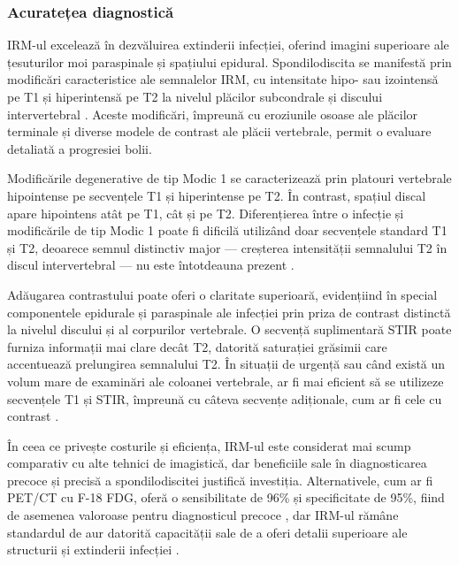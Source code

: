 \documentclass[romanian,12pt,a4paper]{article}
\begin{document}
\subsubsection{Acuratețea diagnostică}

IRM-ul excelează în dezvăluirea extinderii infecției, oferind imagini
superioare ale țesuturilor moi paraspinale și spațiului epidural.
Spondilodiscita se manifestă prin modificări caracteristice ale
semnalelor IRM, cu intensitate hipo- sau izointensă pe T1 și
hiperintensă pe T2 la nivelul plăcilor subcondrale și discului
intervertebral \cite{DiagnosticPerformanceMultiDetector2022}. Aceste
modificări, împreună cu eroziunile osoase ale plăcilor terminale și
diverse modele de contrast ale plăcii vertebrale, permit o evaluare
detaliată a progresiei bolii.

Modificările degenerative de tip Modic 1 se caracterizează prin platouri
vertebrale hipointense pe secvențele T1 și hiperintense pe T2. În
contrast, spațiul discal apare hipointens atât pe T1, cât și pe T2.
Diferențierea între o infecție și modificările de tip Modic 1 poate fi
dificilă utilizând doar secvențele standard T1 și T2, deoarece semnul
distinctiv major --- creșterea intensității semnalului T2 în discul
intervertebral --- nu este întotdeauna prezent
\cite{DegenerativeDiskDisease1988}.

Adăugarea contrastului poate oferi o claritate superioară, evidențiind
în special componentele epidurale și paraspinale ale infecției prin
priza de contrast distinctă la nivelul discului și al corpurilor
vertebrale. O secvență suplimentară STIR poate furniza informații mai
clare decât T2, datorită saturației grăsimii care accentuează
prelungirea semnalului T2. În situații de urgență sau când există un
volum mare de examinări ale coloanei vertebrale, ar fi mai eficient să
se utilizeze secvențele T1 și STIR, împreună cu câteva secvențe
adiționale, cum ar fi cele cu contrast
\cite{DiffusionweightedMRIClaw2014}.

În ceea ce privește costurile și eficiența, IRM-ul este considerat mai
scump comparativ cu alte tehnici de imagistică, dar beneficiile sale în
diagnosticarea precoce și precisă a spondilodiscitei justifică
investiția. Alternativele, cum ar fi PET/CT cu F-18 FDG, oferă o
sensibilitate de 96\% și specificitate de 95\%, fiind de asemenea
valoroase pentru diagnosticul precoce , dar IRM-ul rămâne standardul de
aur datorită capacității sale de a oferi detalii superioare ale
structurii și extinderii infecției \cite{ComparisonDiagnosticValue2017}.
\end{document}
